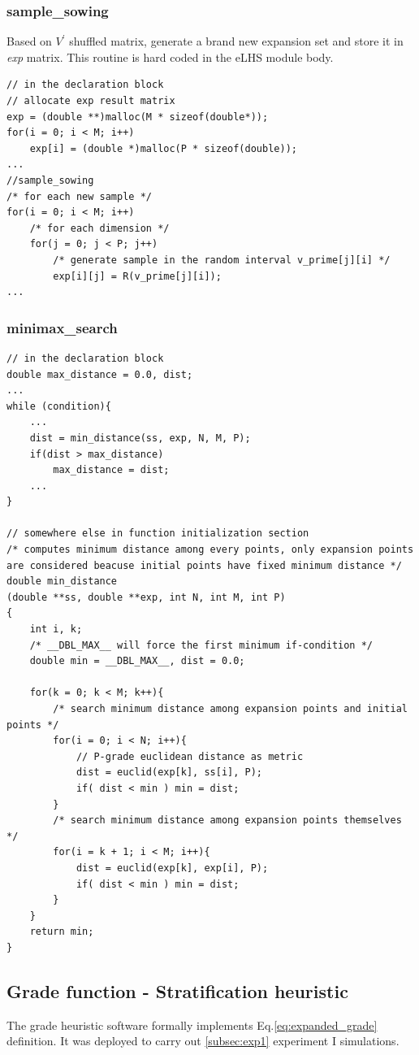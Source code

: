 \documentclass[12pt]{extarticle}
\newcommand{\meqref}[1]{Eq.\ref{#1}}
\begin{document}
\subsubsection{sample{\_}sowing}
Based on $V^\prime$ shuffled matrix, generate a brand new expansion set and store it in \emph{exp} matrix. This routine is hard coded in the eLHS module body. 

\begin{lstlisting}[style=CStyle]
// in the declaration block
// allocate exp result matrix 
exp = (double **)malloc(M * sizeof(double*));
for(i = 0; i < M; i++)
	exp[i] = (double *)malloc(P * sizeof(double));
...
//sample_sowing
/* for each new sample */
for(i = 0; i < M; i++)
	/* for each dimension */
	for(j = 0; j < P; j++)
		/* generate sample in the random interval v_prime[j][i] */
		exp[i][j] = R(v_prime[j][i]);
...	
\end{lstlisting}

\subsubsection{minimax{\_}search}

\begin{lstlisting}[style=CStyle]
// in the declaration block
double max_distance = 0.0, dist;
...
while (condition){
	...
	dist = min_distance(ss, exp, N, M, P);
	if(dist > max_distance)
		max_distance = dist;
	...
}

// somewhere else in function initialization section
/* computes minimum distance among every points, only expansion points are considered beacuse initial points have fixed minimum distance */
double min_distance
(double **ss, double **exp, int N, int M, int P)
{
    int i, k;
    /* __DBL_MAX__ will force the first minimum if-condition */
    double min = __DBL_MAX__, dist = 0.0;
    
    for(k = 0; k < M; k++){
    	/* search minimum distance among expansion points and initial points */
        for(i = 0; i < N; i++){
        	// P-grade euclidean distance as metric
            dist = euclid(exp[k], ss[i], P);
            if( dist < min ) min = dist;
        }
    	/* search minimum distance among expansion points themselves */
        for(i = k + 1; i < M; i++){
            dist = euclid(exp[k], exp[i], P);
            if( dist < min ) min = dist;
        }
    }
    return min;
}
\end{lstlisting}

\subsection{Grade function - Stratification heuristic}
\label{subsec:grade_code}
The grade heuristic software formally implements \meqref{eq:expanded_grade} definition. It was deployed to carry out \cref{subsec:exp1} experiment I simulations.
\end{document}
